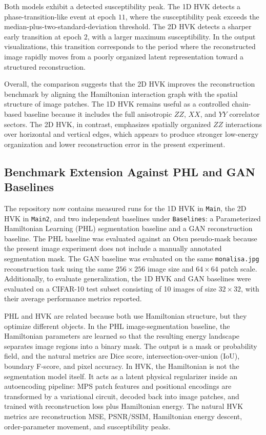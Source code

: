 \documentclass[11pt]{article}
\begin{document}
Both models exhibit a detected susceptibility peak. The 1D HVK detects a phase-transition-like event at epoch $11$, where the susceptibility peak exceeds the median-plus-two-standard-deviation threshold. The 2D HVK detects a sharper early transition at epoch $2$, with a larger maximum susceptibility. In the output visualizations, this transition corresponds to the period where the reconstructed image rapidly moves from a poorly organized latent representation toward a structured reconstruction.

Overall, the comparison suggests that the 2D HVK improves the reconstruction benchmark by aligning the Hamiltonian interaction graph with the spatial structure of image patches. The 1D HVK remains useful as a controlled chain-based baseline because it includes the full anisotropic $ZZ$, $XX$, and $YY$ correlator sectors. The 2D HVK, in contrast, emphasizes spatially organized $ZZ$ interactions over horizontal and vertical edges, which appears to produce stronger low-energy organization and lower reconstruction error in the present experiment.

\subsection{Benchmark Extension Against PHL and GAN Baselines}

The repository now contains measured runs for the 1D HVK in \texttt{Main}, the 2D HVK in \texttt{Main2}, and two independent baselines under \texttt{Baselines}: a Parameterized Hamiltonian Learning (PHL) segmentation baseline and a GAN reconstruction baseline. The PHL baseline was evaluated against an Otsu pseudo-mask because the present image experiment does not include a manually annotated segmentation mask. The GAN baseline was evaluated on the same \texttt{monalisa.jpg} reconstruction task using the same $256\times256$ image size and $64\times64$ patch scale. Additionally, to evaluate generalization, the 1D HVK and GAN baselines were evaluated on a CIFAR-10 test subset consisting of 10 images of size $32\times32$, with their average performance metrics reported.

PHL and HVK are related because both use Hamiltonian structure, but they optimize different objects. In the PHL image-segmentation baseline, the Hamiltonian parameters are learned so that the resulting energy landscape separates image regions into a binary mask. The output is a mask or probability field, and the natural metrics are Dice score, intersection-over-union (IoU), boundary F-score, and pixel accuracy. In HVK, the Hamiltonian is not the segmentation model itself. It acts as a latent physical regularizer inside an autoencoding pipeline: MPS patch features and positional encodings are transformed by a variational circuit, decoded back into image patches, and trained with reconstruction loss plus Hamiltonian energy. The natural HVK metrics are reconstruction MSE, PSNR/SSIM, Hamiltonian energy descent, order-parameter movement, and susceptibility peaks.
\end{document}

